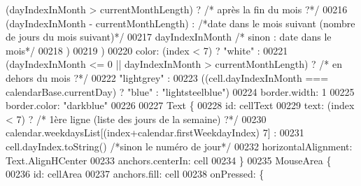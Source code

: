 \begin{DoxyCode}
{{{                                  (dayIndexInMonth > currentMonthLength) ? \textcolor{comment}{/* après la fin du mois ?*/}
00216                                                                                                            
                                                                           (dayIndexInMonth - currentMonthLength) 
      : \textcolor{comment}{/*date dans le mois suivant (nombre de jours du mois suivant)*/}
00217                                                                                                            
                                                                           dayIndexInMonth \textcolor{comment}{/* sinon : date dans le
       mois*/}
00218                                                                                                            
                                  )
00219                                                                   )
00220                         color: (index < 7) ? \textcolor{stringliteral}{"white"} :
00221                                              (dayIndexInMonth <= 0 || dayIndexInMonth > currentMonthLength)
       ? \textcolor{comment}{/* en dehors du mois ?*/}
00222                                                                                                            
         \textcolor{stringliteral}{"lightgrey"} :
00223                                                                                                            
         ((cell.dayIndexInMonth === calendarBase.currentDay) ? \textcolor{stringliteral}{"blue"} : \textcolor{stringliteral}{"lightsteelblue"})
00224                         border.width: 1
00225                         border.color: \textcolor{stringliteral}{"darkblue"}
00226 
00227                         Text \{
00228                             \textcolor{keywordtype}{id}: cellText
00229                             text: (index < 7) ? \textcolor{comment}{/* 1ère ligne (liste des jours de la semaine) ?*/}
00230                                                 calendar.weekdaysList[(index+calendar.firstWeekdayIndex) %
      7] :
00231                                                 cell.dayIndex.toString() \textcolor{comment}{/*sinon le numéro de jour*/}
00232                             horizontalAlignment: Text.AlignHCenter
00233                             anchors.centerIn: cell
00234                         \}
00235                         MouseArea \{
00236                             \textcolor{keywordtype}{id}: cellArea
00237                             anchors.fill: cell
00238                             onPressed: \{
}}}
\end{DoxyCode}
